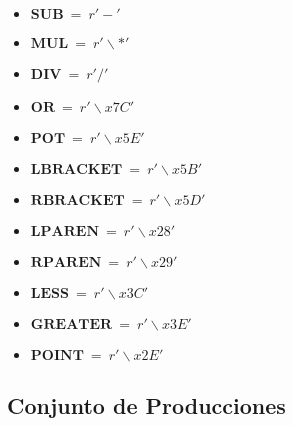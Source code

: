 \begin{itemize}
 \item []$\mathbf{SUB}\ =\ r'-'$
 \item []$\mathbf{MUL}\ =\ r'\backslash *'$
 \item []$\mathbf{DIV}\ =\ r'/'$
 \item []$\mathbf{OR}\ =\ r'\backslash x7C'$
 \item []$\mathbf{POT}\ =\ r'\backslash x5E'$
 \item []$\mathbf{LBRACKET}\ =\ r'\backslash x5B'$
 \item []$\mathbf{RBRACKET}\ =\ r'\backslash x5D'$
 \item []$\mathbf{LPAREN}\ =\ r'\backslash x28'$
 \item []$\mathbf{RPAREN}\ =\ r'\backslash x29'$
 \item []$\mathbf{LESS}\ =\ r'\backslash x3C'$
 \item []$\mathbf{GREATER}\ =\ r'\backslash x3E'$
 \item []$\mathbf{POINT}\ =\ r'\backslash x2E'$
\end{itemize}


\noindent



\newpage
\subsection{Conjunto de Producciones}

